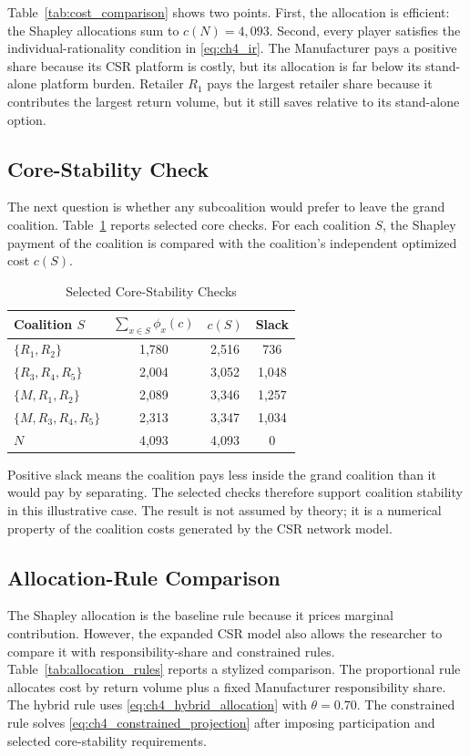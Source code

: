 Table~\ref{tab:cost_comparison} shows two points. First, the allocation is efficient: the Shapley allocations sum to $c(N)=4{,}093$. Second, every player satisfies the individual-rationality condition in \eqref{eq:ch4_ir}. The Manufacturer pays a positive share because its CSR platform is costly, but its allocation is far below its stand-alone platform burden. Retailer $R_1$ pays the largest retailer share because it contributes the largest return volume, but it still saves relative to its stand-alone option.

\subsection{Core-Stability Check}

The next question is whether any subcoalition would prefer to leave the grand coalition. Table~\ref{tab:core_check} reports selected core checks. For each coalition $S$, the Shapley payment of the coalition is compared with the coalition's independent optimized cost $c(S)$.

\begin{table}[htbp]
\centering
\caption{Selected Core-Stability Checks}
\label{tab:core_check}
\begin{tabular}{lccc}
\toprule
\textbf{Coalition $S$} & $\sum_{x\in S}\phi_x(c)$ & $c(S)$ & \textbf{Slack} \\
\midrule
$\{R_1,R_2\}$ & 1,780 & 2,516 & 736 \\
$\{R_3,R_4,R_5\}$ & 2,004 & 3,052 & 1,048 \\
$\{M,R_1,R_2\}$ & 2,089 & 3,346 & 1,257 \\
$\{M,R_3,R_4,R_5\}$ & 2,313 & 3,347 & 1,034 \\
$N$ & 4,093 & 4,093 & 0 \\
\bottomrule
\end{tabular}
\end{table}

Positive slack means the coalition pays less inside the grand coalition than it would pay by separating. The selected checks therefore support coalition stability in this illustrative case. The result is not assumed by theory; it is a numerical property of the coalition costs generated by the CSR network model.

\subsection{Allocation-Rule Comparison}

The Shapley allocation is the baseline rule because it prices marginal contribution. However, the expanded CSR model also allows the researcher to compare it with responsibility-share and constrained rules. Table~\ref{tab:allocation_rules} reports a stylized comparison. The proportional rule allocates cost by return volume plus a fixed Manufacturer responsibility share. The hybrid rule uses \eqref{eq:ch4_hybrid_allocation} with $\theta=0.70$. The constrained rule solves \eqref{eq:ch4_constrained_projection} after imposing participation and selected core-stability requirements.

